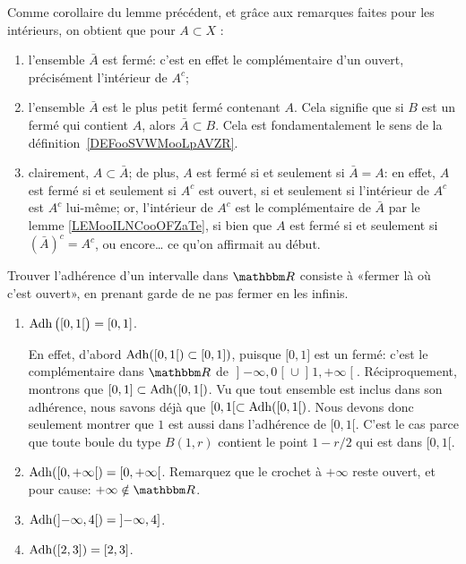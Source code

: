 \begin{remark}\label{RemAdhFerme}\label{EXooICLBooJzQFNY}
  Comme corollaire du lemme précédent, et grâce aux remarques faites pour les intérieurs, on obtient que pour \( A \subset X \) :
  \begin{enumerate}
  \item
    l'ensemble \( \bar A \) est fermé: c'est en effet le complémentaire d'un ouvert, précisément l'intérieur de \( A^c \);
  \item
    l'ensemble $\bar A$ est le plus petit fermé contenant $A$. Cela signifie que si $B$ est un fermé qui contient $A$, alors $\bar A\subset B$. Cela est fondamentalement le sens de la définition~\ref{DEFooSVWMooLpAVZR}.
  \item
    clairement, \( A \subset \bar A \); de plus, \( A \) est fermé si et seulement si \( \bar A = A \): en effet, \( A \) est fermé si et seulement si \( A^c \) est ouvert, si et seulement si l'intérieur de \( A^c \) est \( A^c \) lui-même; or, l'intérieur de \( A^c \) est le complémentaire de \( \bar A \) par le lemme \ref{LEMooILNCooOFZaTe}, si bien que \( A \) est fermé si et seulement si \( (\bar A)^c  = A^c \), ou encore\dots{} ce qu'on affirmait au début.
  \end{enumerate}
\end{remark}

\begin{example}
  Trouver l'adhérence d'un intervalle dans $\eR$ consiste à «fermer là où c'est ouvert», en prenant garde de ne pas fermer en les infinis.
 \begin{enumerate}
  \item
    $\operatorname{Adh}\big(\mathopen[ 0 , 1 [\big)=\mathopen[ 0 , 1 \mathclose]$.

    En effet, d'abord $\operatorname{Adh}(\mathopen[ 0 , 1 \mathclose[ )\subset\mathopen[ 0,1  \mathclose])$, puisque $\mathopen[ 0,1  \mathclose]$ est un fermé: c'est le complémentaire dans $\eR$ de $\mathopen]-\infty, 0\mathclose [ \cup \mathopen]1, +\infty\mathclose[$. Réciproquement, montrons que $\mathopen[ 0,1  \mathclose] \subset \operatorname{Adh}(\mathopen[ 0 , 1 \mathclose[)$.  Vu que tout ensemble est inclus dans son adhérence, nous savons déjà que $\mathopen[ 0 , 1 [\subset\operatorname{Adh}( \mathopen[ 0 , 1 [ )$. Nous devons donc seulement montrer que $1$ est aussi dans l'adhérence de $\mathopen[ 0 , 1 [$. C'est le cas parce que toute boule du type $B(1,r)$ contient le point $1-r/2$ qui est dans $\mathopen[ 0 , 1 [$.
  \item
    $\operatorname{Adh}( \mathopen[ 0 , + \infty [)=\mathopen[ 0 , + \infty \mathclose[$. Remarquez que le crochet à $+\infty$ reste ouvert, et pour cause: $+\infty \notin \eR$.
  \item
    $\operatorname{Adh}( \mathopen] - \infty, 4 [ )=\mathopen] - \infty, 4 \mathclose]$.
  \item
    $\operatorname{Adh}( \mathopen[ 2 , 3 \mathclose] )=\mathopen[ 2 , 3 \mathclose]$.
  \end{enumerate}
\end{example}

